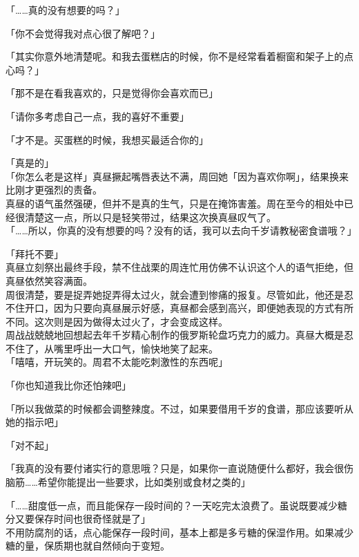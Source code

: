 「……真的没有想要的吗？」

「你不会觉得我对点心很了解吧？」

「其实你意外地清楚呢。和我去蛋糕店的时候，你不是经常看着橱窗和架子上的点心吗？」

「那不是在看我喜欢的，只是觉得你会喜欢而已」

「请你多考虑自己一点，我的喜好不重要」

「才不是。买蛋糕的时候，我想买最适合你的」

「真是的」\\

「你怎么老是这样」真昼撅起嘴唇表达不满，周回她「因为喜欢你啊」，结果换来比刚才更强烈的责备。\\

真昼的语气虽然强硬，但并不是真的生气，只是在掩饰害羞。周在至今的相处中已经很清楚这一点，所以只是轻笑带过，结果这次换真昼叹气了。\\

「……所以，你真的没有想要的吗？没有的话，我可以去向千岁请教秘密食谱哦？」

「拜托不要」\\

真昼立刻祭出最终手段，禁不住战栗的周连忙用仿佛不认识这个人的语气拒绝，但真昼依然笑容满面。\\

周很清楚，要是捉弄她捉弄得太过火，就会遭到惨痛的报复。尽管如此，他还是忍不住开口，因为只要向真昼展示好感，真昼都会感到高兴，即便她表现的方式有所不同。这次则是因为做得太过火了，才会变成这样。\\

周战战兢兢地回想起去年千岁精心制作的俄罗斯轮盘巧克力的威力。真昼大概是忍不住了，从嘴里呼出一大口气，愉快地笑了起来。\\

「嘻嘻，开玩笑的。周君不太能吃刺激性的东西呢」

「你也知道我比你还怕辣吧」

「所以我做菜的时候都会调整辣度。不过，如果要借用千岁的食谱，那应该要听从她的指示吧」

「对不起」

「我真的没有要付诸实行的意思哦？只是，如果你一直说随便什么都好，我会很伤脑筋……希望你能提出一些要求，比如类别或食材之类的」

「……甜度低一点，而且能保存一段时间的？一天吃完太浪费了。虽说既要减少糖分又要保存时间也很奇怪就是了」\\

不用防腐剂的话，点心能保存一段时间，基本上都是多亏糖的保湿作用。如果减少糖的量，保质期也就自然倾向于变短。\\

